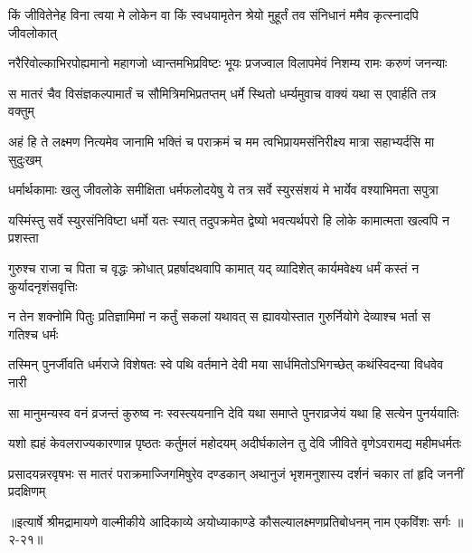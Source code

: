 \twolineshloka
{किं जीवितेनेह विना त्वया मे लोकेन वा किं स्वधयामृतेन}
{श्रेयो मुहूर्तं तव संनिधानं ममैव कृत्स्नादपि जीवलोकात्} %

\twolineshloka
{नरैरिवोल्काभिरपोह्यमानो महागजो ध्वान्तमभिप्रविष्टः}
{भूयः प्रजज्वाल विलापमेवं निशम्य रामः करुणं जनन्याः} %

\twolineshloka
{स मातरं चैव विसंज्ञकल्पामार्तं च सौमित्रिमभिप्रतप्तम्}
{धर्मे स्थितो धर्म्यमुवाच वाक्यं यथा स एवार्हति तत्र वक्तुम्} %

\twolineshloka
{अहं हि ते लक्ष्मण नित्यमेव जानामि भक्तिं च पराक्रमं च}
{मम त्वभिप्रायमसंनिरीक्ष्य मात्रा सहाभ्यर्दसि मा सुदुःखम्} %

\twolineshloka
{धर्मार्थकामाः खलु जीवलोके समीक्षिता धर्मफलोदयेषु}
{ये तत्र सर्वे स्युरसंशयं मे भार्येव वश्याभिमता सपुत्रा} %

\twolineshloka
{यस्मिंस्तु सर्वे स्युरसंनिविष्टा धर्मो यतः स्यात् तदुपक्रमेत}
{द्वेष्यो भवत्यर्थपरो हि लोके कामात्मता खल्वपि न प्रशस्ता} %

\twolineshloka
{गुरुश्च राजा च पिता च वृद्धः क्रोधात् प्रहर्षादथवापि कामात्}
{यद् व्यादिशेत् कार्यमवेक्ष्य धर्मं कस्तं न कुर्यादनृशंसवृत्तिः} %

\twolineshloka
{न तेन शक्नोमि पितुः प्रतिज्ञामिमां न कर्तुं सकलां यथावत्}
{स ह्यावयोस्तात गुरुर्नियोगे देव्याश्च भर्ता स गतिश्च धर्मः} %

\twolineshloka
{तस्मिन् पुनर्जीवति धर्मराजे विशेषतः स्वे पथि वर्तमाने}
{देवी मया सार्धमितोऽभिगच्छेत् कथंस्विदन्या विधवेव नारी} %

\twolineshloka
{सा मानुमन्यस्व वनं व्रजन्तं कुरुष्व नः स्वस्त्ययनानि देवि}
{यथा समाप्ते पुनराव्रजेयं यथा हि सत्येन पुनर्ययातिः} %

\twolineshloka
{यशो ह्यहं केवलराज्यकारणान्न पृष्ठतः कर्तुमलं महोदयम्}
{अदीर्घकालेन तु देवि जीविते वृणेऽवरामद्य महीमधर्मतः} %

\twolineshloka
{प्रसादयन्नरवृषभः स मातरं पराक्रमाज्जिगमिषुरेव दण्डकान्}
{अथानुजं भृशमनुशास्य दर्शनं चकार तां हृदि जननीं प्रदक्षिणम्} %


॥इत्यार्षे श्रीमद्रामायणे वाल्मीकीये आदिकाव्ये अयोध्याकाण्डे कौसल्यालक्ष्मणप्रतिबोधनम् नाम एकविंशः सर्गः ॥२-२१॥

